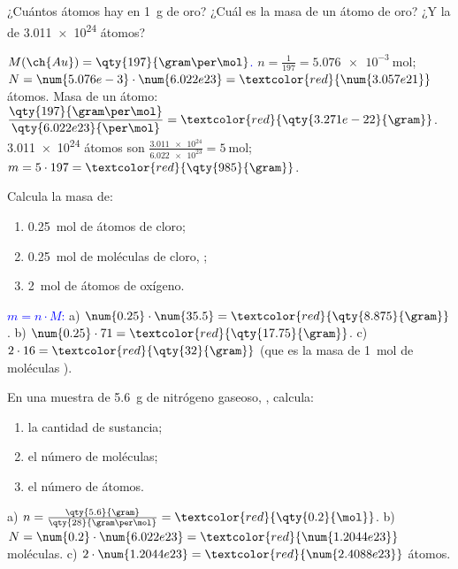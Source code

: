 \begin{exercise}
    ¿Cuántos átomos hay en \qty{1}{\gram} de oro? ¿Cuál es la masa de un átomo de oro? ¿Y la de \num{3.011e24} átomos?
    \begin{solu}
        \textcolor{blue}{\(M(\ch{Au}) = \qty{197}{\gram\per\mol}\).}
        \(n = \frac{1}{197} = \qty{5.076e-3}{\mol}\); \(N = \num{5.076e-3} \cdot \num{6.022e23} = \textcolor{red}{\num{3.057e21}}\) átomos.
        Masa de un átomo: \(\dfrac{\qty{197}{\gram\per\mol}}{\qty{6.022e23}{\per\mol}} = \textcolor{red}{\qty{3.271e-22}{\gram}}\).
        \num{3.011e24} átomos son \(\frac{\num{3.011e24}}{\num{6.022e23}} = \qty{5}{\mol}\); \(m = 5 \cdot 197 = \textcolor{red}{\qty{985}{\gram}}\).
    \end{solu}
\end{exercise}

\begin{exercise}
    Calcula la masa de:
    \begin{enumerate}[label=\alph*)]
        \item \qty{0.25}{\mol} de átomos de cloro;
        \item \qty{0.25}{\mol} de moléculas de cloro, ;
        \item \qty{2}{\mol} de átomos de oxígeno.
    \end{enumerate}
    \begin{solu}
        \textcolor{blue}{\(m = n \cdot M\):}
        a) \(\num{0.25} \cdot \num{35.5} = \textcolor{red}{\qty{8.875}{\gram}}\). b) \(\num{0.25} \cdot 71 = \textcolor{red}{\qty{17.75}{\gram}}\). c) \(2 \cdot 16 = \textcolor{red}{\qty{32}{\gram}}\) (que es la masa de \qty{1}{\mol} de moléculas ).
    \end{solu}
\end{exercise}

\begin{exercise}
    En una muestra de \qty{5.6}{\gram} de nitrógeno gaseoso, , calcula:
    \begin{enumerate}[label=\alph*)]
        \item la cantidad de sustancia;
        \item el número de moléculas;
        \item el número de átomos.
    \end{enumerate}
    \begin{solu}
        a) \(n = \frac{\qty{5.6}{\gram}}{\qty{28}{\gram\per\mol}} = \textcolor{red}{\qty{0.2}{\mol}}\). b) \(N = \num{0.2} \cdot \num{6.022e23} = \textcolor{red}{\num{1.2044e23}}\) moléculas. c) \(2 \cdot \num{1.2044e23} = \textcolor{red}{\num{2.4088e23}}\) átomos.
    \end{solu}
\end{exercise}

